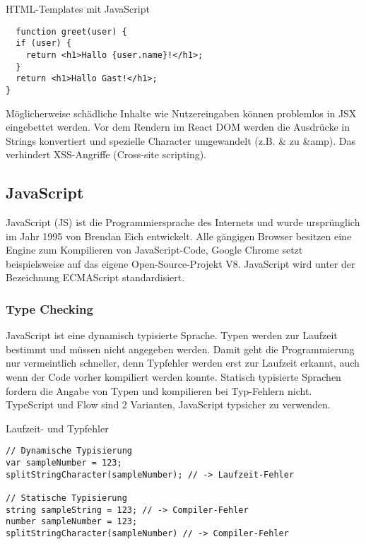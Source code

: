 \begin{listing}
\caption{HTML-Templates mit JavaScript}
\label{lst:listing2}
\begin{verbatim}
  function greet(user) {
  if (user) {
    return <h1>Hallo {user.name}!</h1>;
  }
  return <h1>Hallo Gast!</h1>;
}
\end{verbatim}
\end{listing}

Möglicherweise schädliche Inhalte wie Nutzereingaben können problemlos in JSX eingebettet werden. Vor dem Rendern im React DOM werden die Ausdrücke in Strings konvertiert und spezielle Character umgewandelt (z.B. \& zu \&amp). Das verhindert XSS-Angriffe (Cross-site scripting).

\subsection{JavaScript}
JavaScript (JS) ist die Programmiersprache des Internets und wurde ursprünglich im Jahr 1995 von Brendan Eich entwickelt. Alle gängigen Browser besitzen eine Engine zum Kompilieren von JavaScript-Code, Google Chrome setzt beispielsweise auf das eigene Open-Source-Projekt V8. JavaScript wird unter der Bezeichnung ECMAScript standardisiert.

\subsubsection{Type Checking}

JavaScript ist eine dynamisch typisierte Sprache. Typen werden zur Laufzeit bestimmt und müssen nicht angegeben werden. Damit geht die Programmierung nur vermeintlich schneller, denn Typfehler werden erst zur Laufzeit erkannt, auch wenn der Code vorher kompiliert werden konnte. Statisch typisierte Sprachen fordern die Angabe von Typen und kompilieren bei Typ-Fehlern nicht. TypeScript und Flow sind 2 Varianten, JavaScript typsicher zu verwenden.

\begin{listing}
\caption{Laufzeit- und Typfehler}
\label{lst:listing3}
\begin{verbatim}
// Dynamische Typisierung
var sampleNumber = 123;
splitStringCharacter(sampleNumber); // -> Laufzeit-Fehler

// Statische Typisierung
string sampleString = 123; // -> Compiler-Fehler
number sampleNumber = 123;
splitStringCharacter(sampleNumber) // -> Compiler-Fehler
\end{verbatim}
\end{listing}

